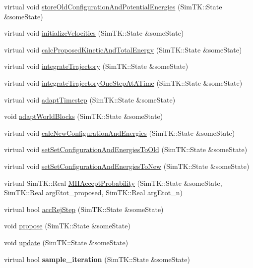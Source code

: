 \begin{DoxyCompactItemize}
\item 
virtual void \hyperlink{classHMCSampler_a8c9a03dba406c0d4bef622c42d399b19}{store\+Old\+Configuration\+And\+Potential\+Energies} (Sim\+T\+K\+::\+State \&some\+State)
\item 
virtual void \hyperlink{classHMCSampler_ae38d8206113980732d4adced081c50fd}{initialize\+Velocities} (Sim\+T\+K\+::\+State \&some\+State)
\item 
virtual void \hyperlink{classHMCSampler_a492f12a031effba381c409052ab734e7}{calc\+Proposed\+Kinetic\+And\+Total\+Energy} (Sim\+T\+K\+::\+State \&some\+State)
\item 
virtual void \hyperlink{classHMCSampler_ab3b4de64be2a10193e274f05788b5ca5}{integrate\+Trajectory} (Sim\+T\+K\+::\+State \&some\+State)
\item 
virtual void \hyperlink{classHMCSampler_a4e74ce67f749317e106a528e2791df9d}{integrate\+Trajectory\+One\+Step\+At\+A\+Time} (Sim\+T\+K\+::\+State \&some\+State)
\item 
virtual void \hyperlink{classHMCSampler_aa3b0a772e2ba3ea1550ec834e887fc67}{adapt\+Timestep} (Sim\+T\+K\+::\+State \&some\+State)
\item 
void \hyperlink{classHMCSampler_a90ffe962e5317623389f4db7a85e0592}{adapt\+World\+Blocks} (Sim\+T\+K\+::\+State \&some\+State)
\item 
virtual void \hyperlink{classHMCSampler_a4716c29b164a3f9f239266e970498201}{calc\+New\+Configuration\+And\+Energies} (Sim\+T\+K\+::\+State \&some\+State)
\item 
virtual void \hyperlink{classHMCSampler_a26452f17a85fadebcf44bddb44954cc6}{set\+Set\+Configuration\+And\+Energies\+To\+Old} (Sim\+T\+K\+::\+State \&some\+State)
\item 
virtual void \hyperlink{classHMCSampler_a4deb485f9bfc31d64f6ada06536f9230}{set\+Set\+Configuration\+And\+Energies\+To\+New} (Sim\+T\+K\+::\+State \&some\+State)
\item 
virtual Sim\+T\+K\+::\+Real \hyperlink{classHMCSampler_a7fee5ad6d531c32235db96c4b95f1eca}{M\+H\+Accept\+Probability} (Sim\+T\+K\+::\+State \&some\+State, Sim\+T\+K\+::\+Real arg\+Etot\+\_\+proposed, Sim\+T\+K\+::\+Real arg\+Etot\+\_\+n)
\item 
virtual bool \hyperlink{classHMCSampler_af5e87c855b8888196a9f2ad87bb9f824}{acc\+Rej\+Step} (Sim\+T\+K\+::\+State \&some\+State)
\item 
void \hyperlink{classHMCSampler_aa36ab4482bbb6295658e8fe6a49c9e4f}{propose} (Sim\+T\+K\+::\+State \&some\+State)
\item 
void \hyperlink{classHMCSampler_a864175524b6023f505357b10b1a5855b}{update} (Sim\+T\+K\+::\+State \&some\+State)
\item 
virtual bool {\bfseries sample\+\_\+iteration} (Sim\+T\+K\+::\+State \&some\+State)\hypertarget{classHMCSampler_ae27a31bb0f1e6b71c830db555ca97d2f}{}\label{classHMCSampler_ae27a31bb0f1e6b71c830db555ca97d2f}


\end{DoxyCompactItemize}
